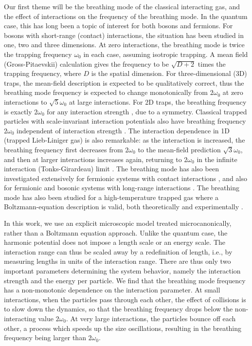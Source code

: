 \documentclass[a4paper, onecolumn]{revtex4-1}
\begin{document}
Our first theme will be the breathing mode of the classical interacting gas, and the effect of
interactions on the frequency of the breathing mode.  In the quantum case, this has long been a
topic of interest for both bosons and fermions.  For bosons with short-range (contact) interactions,
the situation has been studied in one, two and three dimensions.  At zero interactions, the
breathing mode is twice the trapping frequency $\omega_0$ in each case, assuming isotropic trapping.
A mean field (Gross-Pitaevskii) calculation gives the frequency to be $\sqrt{D+2}$ times the
trapping frequency, where $D$ is the spatial dimension.  For three-dimensional (3D) traps, the
mean-field description is expected to be qualitatively correct, thus the breathing mode frequency is
expected to change monotonically from $2\omega_0$ at zero interactions to $\sqrt{5}\omega_0$ at
large interactions.  For 2D traps, the breathing frequency is exactly $2\omega_0$ for any
interaction strength \cite{PitaevskiiRosch_PRA97}, due to a symmetry.  Classical trapped particles
with scale-invariant interaction potentials also have breathing frequency $2\omega_0$ independent of
interaction strength \cite{PitaevskiiRosch_PRA97}.  The interaction dependence in 1D (trapped
Lieb-Liniger gas) is also remarkable: as the interaction is increased, the breathing frequency first
decreases from $2\omega_0$ to the mean-field prediction $\sqrt{3}\omega_0$, and then at larger
interactions increases again, returning to $2\omega_0$ in the infinite interaction (Tonks-Girardeau)
limit \cite{Naegerl_Science09, Tschischik_BHbreathing_PRA_2013, 1D_breathing_mode_recent,
  Bouchoule_PRL2014, KroenkeSchmelcher_BM}.
%
The breathing mode has also been investigated extensively for fermionic systems with contact
interactions \cite{GrimmSmith_unitaryfermions_PRA08, fermion2Dbreathing,
  Stringari_lowDcollective_PRA15}, and also for fermionic and bosonic systems with long-range
interactions \cite{OrignacCitro_PRA08, br_mode_long_range_interactions, Bonitz_Review}.  The
breathing mode has also been studied for a high-temperature trapped gas where a Boltzmann-equation
description is valid, both theoretically \cite{Guery-Odelin1999} and experimentally
\cite{Cornell_classsical_3Dexpt_NatPhys15}.

In this work, we use an explicit microscopic model treated microcanonically, rather than a Boltzmann
equation approach.  Unlike the quantum case, the harmonic potential does not impose a length scale
or an energy scale.  The interaction range can thus be scaled away by a redefinition of length,
i.e., by measuring lengths in units of the interaction range.  There are thus only two important
parameters determining the system behavior, namely the interaction strength and the energy per
particle.  We find that the breathing mode frequency has a non-monotonic dependence on the
interaction parameter.  At small interactions, when the particles pass through each other, the
effect of collisions is to slow down the dynamics, so that the breathing frequency drops below the
non-interacting value $2\omega_0$.  At very large interactions, the particles bounce off each other,
a process which speeds up the size oscillations, resulting in the breathing frequency being larger
than $2\omega_0$.
\end{document}
